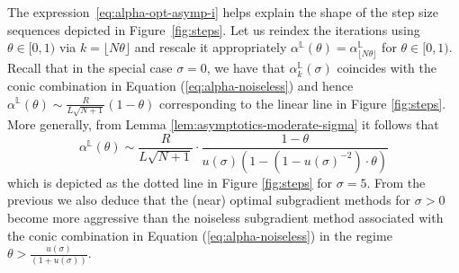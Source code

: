 \documentclass{article}
\begin{document}
  The expression~\eqref{eq:alpha-opt-asymp-i} helps explain the shape of the step size sequences depicted in Figure~\ref{fig:steps}.
  Let us reindex the iterations using $\theta\in[0,1)$ via $k=\lfloor N\theta\rfloor$ and rescale it appropriately
  $\alpha^{\mathbb L}(\theta)= \alpha^{\mathbb L}_{\lfloor N\theta\rfloor}$ for $\theta\in[0,1)$.
  Recall that in the special case $\sigma=0$, we have that $\alpha^{\mathbb L}_k(\sigma)$ coincides with the conic combination in Equation (\ref{eq:alpha-noiseless}) and hence
  \(
    \alpha^{\mathbb L}(\theta) \sim \tfrac{R}{L\sqrt{N+1}}  (1-\theta)
  \)
  corresponding to the linear line in Figure \ref{fig:steps}.
  More generally, from Lemma \ref{lem:asymptotics-moderate-sigma} it follows that
  \[
    \alpha^{\mathbb L}(\theta)\sim \frac{R}{L\sqrt{N+1}} \cdot \frac{1-\theta}{u(\sigma)(1-(1-u(\sigma)^{-2})\cdot\theta)}
  \]
  which is depicted as the dotted line in Figure \ref{fig:steps} for $\sigma=5$.
  From the previous we also deduce that the (near) optimal subgradient methods for $\sigma>0$ become more aggressive than the noiseless subgradient method associated with the conic combination in Equation (\ref{eq:alpha-noiseless}) in the regime
  \(
    \theta>\tfrac{u(\sigma)}{(1+u(\sigma))}.
  \)

\end{document}
